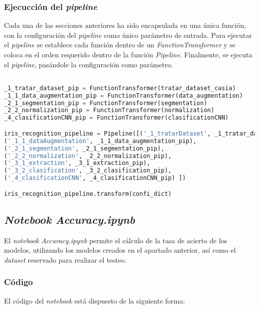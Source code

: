 {\subsubsection{Ejecucción del \textit{pipeline}}

Cada una de las secciones anteriores ha sido encapsulada en una única función, con la configuración del \textit{pipeline} como único parámetro de entrada.
Para ejecutar el \textit{pipeline} se establece cada función dentro de un \textit{FunctionTransformer} y se coloca en el orden requerido dentro de la función \textit{Pipeline}.
Finalmente, se ejecuta el \textit{pipeline}, pasándole la configuración como parámetro.


\begin{lstlisting}[language=Python] 

_1_tratar_dataset_pip = FunctionTransformer(tratar_dataset_casia)
_1_1_data_augmentation_pip = FunctionTransformer(data_augmentation)
_2_1_segmentation_pip = FunctionTransformer(segmentation)
_2_2_normalization_pip = FunctionTransformer(normalization)
_4_clasificationCNN_pip = FunctionTransformer(clasificationCNN)

iris_recognition_pipeline = Pipeline([('_1_tratarDataset', _1_tratar_dataset_pip), 
('_1_1_dataAugmentation', _1_1_data_augmentation_pip), 
('_2_1_segmentation', _2_1_segmentation_pip), 
('_2_2_normalization', _2_2_normalization_pip),
('_3_1_extraction', _3_1_extraction_pip),
('_3_2_clasification', _3_2_clasification_pip), 
('_4_clasificationCNN', _4_clasificationCNN_pip) ])

iris_recognition_pipeline.transform(confi_dict)

\end{lstlisting} 

\subsection{\textit{Notebook} \textit{Accuracy.ipynb}} \label{anx:accuracy}

El \textit{notebook} \textit{Accuracy.ipynb} permite el cálculo de la tasa de acierto de los modelos, utilizando los modelos creados en el apartado anterior,
así como el \textit{dataset} reservado para realizar el testeo.

\subsubsection{Código}

El código del \textit{notebook} está dispuesto de la siguiente forma:

}
